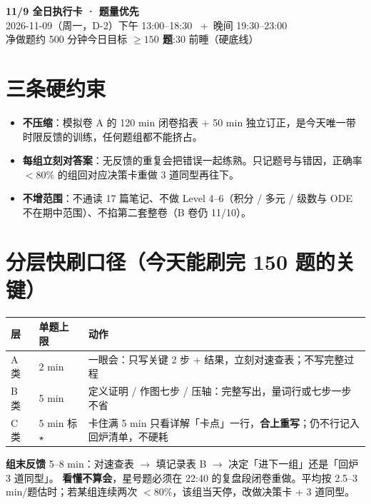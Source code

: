 \documentclass[11pt,a4paper]{ctexart}
\begin{document}
\begin{center}
{\LARGE\bfseries 11/9 全日执行卡 · 题量优先}\\[0.3em]
{\large 2026-11-09（周一，D-2）\quad 下午 13:00--18:30 \ +\ 晚间 19:30--23:00}\\[0.3em]
{\small 净做题约 500 分钟\quad 今日目标 \textbf{$\geq 150$ 题}:30 前睡（硬底线）}
\end{center}

\begin{center}
\end{center}

\section{三条硬约束}
\begin{itemize}
\item \textbf{不压缩}：模拟卷 A 的 120 min 闭卷掐表 + 50 min 独立订正，是今天唯一带时限反馈的训练，任何题组都不能挤占。
\item \textbf{每组立刻对答案}：无反馈的重复会把错误一起练熟。只记题号与错因，正确率 $<80\%$ 的组回对应决策卡重做 3 道同型再往下。
\item \textbf{不增范围}：不通读 17 篇笔记、不做 Level 4--6（积分 / 多元 / 级数与 ODE 不在期中范围）、不掐第二套整卷（B 卷仍 11/10）。
\end{itemize}

\section{分层快刷口径（今天能刷完 150 题的关键）}
\begin{center}
\begin{tabular}{@{}p{2.0cm}p{2.0cm}p{11.6cm}@{}}
\toprule
\textbf{层} & \textbf{单题上限} & \textbf{动作} \\
\midrule
A 类 & 2 min & 一眼会：只写关键 2 步 + 结果，立刻对速查表；不写完整过程 \\
B 类 & 5 min & 定义证明 / 作图七步 / 压轴：完整写出，量词行或七步一步不省 \\
C 类 & 5 min 标 $\star$ & 卡住满 5 min 只看详解「卡点」一行，\textbf{合上重写}；仍不行记入回炉清单，不硬耗 \\
\bottomrule
\end{tabular}
\end{center}
\noindent\textbf{组末反馈} 5--8 min：对速查表 $\to$ 填记录表 B $\to$ 决定「进下一组」还是「回炉 3 道同型」。
\textbf{看懂不算会}，星号题必须在 22:40 的复盘段闭卷重做。平均按 2.5--3 min/题估时；若某组连续两次 $<80\%$，该组当天停，改做决策卡 + 3 道同型。
\end{document}
